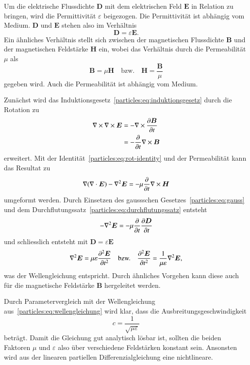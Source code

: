Um die elektrische Flussdichte $\boldsymbol{D}$ mit dem elektrischen Feld $\boldsymbol{E}$ in Relation zu bringen, 
wird die Permittivität $\varepsilon$ beigezogen.
Die Permittivität ist abhängig vom Medium. 
$\boldsymbol{D}$ und $\boldsymbol{E}$ stehen also im Verhältnis
\begin{equation}
    \boldsymbol{D} = \varepsilon \boldsymbol{E}.
    \label{particles:eq:de}
\end{equation}
Ein ähnliches Verhältnis stellt sich zwischen der magnetischen Flussdichte $\boldsymbol{B}$ und der magnetischen Feldstärke $\boldsymbol{H}$ ein, wobei das Verhältnis durch die Permeabilität $\mu$ als
\begin{equation}
    \boldsymbol{B} = \mu \boldsymbol{H} \quad \text{bzw.} \quad \boldsymbol{H} = \frac{\boldsymbol{B}}{\mu}
    \label{particles:eq:bh}
\end{equation}
gegeben wird.
Auch die Permeabilität ist abhängig vom Medium.

Zunächst wird das Induktionsgesetz~\eqref{particles:eq:induktionsgesetz} durch die Rotation zu
\begin{align}
    \nabla \times \nabla \times \boldsymbol{E} 
        &= - \nabla \times \frac{\d\boldsymbol{B}}{\d t} \\
        &= - \frac{\d}{\d t} \nabla \times \boldsymbol{B}
\end{align}
erweitert.
Mit der Identität~\eqref{particles:eq:rot-identity} und der Permeabilität kann das Resultat zu
\[
    \nabla(\nabla \cdot \boldsymbol{E}) - \nabla^2 \boldsymbol{E} = -\mu \frac{\d}{\d t} \nabla \times \boldsymbol{H}
\]
umgeformt werden.
Durch Einsetzen des gaussschen Gesetzes~\eqref{particles:eq:gauss} und dem Durchflutungssatz~\eqref{particles:eq:durchflutungssatz} entsteht
\[
    - \nabla^2 \boldsymbol{E} = -\mu \frac{\d}{\d t} \frac{\d \boldsymbol{D}}{\d t}
\]
und schliesslich entsteht mit $\boldsymbol{D} = \varepsilon \boldsymbol{E}$
\[
    \nabla^2 \boldsymbol{E} = \mu\varepsilon \frac{\d^2 \boldsymbol{E}}{\d t^2} 
    \quad \text{bzw.} \quad
    \frac{\d^2 \boldsymbol{E}}{\d t^2} = \frac{1}{\mu \varepsilon} \nabla^2 \boldsymbol{E},
\]
was der Wellengleichung entspricht.
Durch ähnliches Vorgehen kann diese auch für die magnetische Feldstärke $\boldsymbol{B}$ hergeleitet werden.

Durch Parametervergleich mit der Wellengleichung aus~\eqref{particles:eq:wellengleichung} wird klar, dass die Ausbreitungsgeschwindigkeit
\[
    c = \frac{1}{\sqrt{\mu\varepsilon}}\label{particles:eq:lichtgeschwindigkeit}
\]
beträgt.
Damit die Gleichung gut analytisch lösbar ist, sollten die beiden Faktoren $\mu$ und $\varepsilon$ also über verschiedene Feldstärken konstant sein.
Ansonsten wird aus der linearen partiellen Differenzialgleichung eine nichtlineare.


